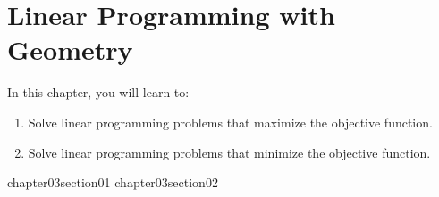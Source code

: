 \chapter{Linear Programming with Geometry}\label{chapter_linear_programming_with_geometry}

In this chapter, you will learn to:

\begin{enumerate}
    \item Solve linear programming problems that maximize the objective function.
    \item Solve linear programming problems that minimize the objective function.
\end{enumerate}


{chapter03section01}
{chapter03section02}